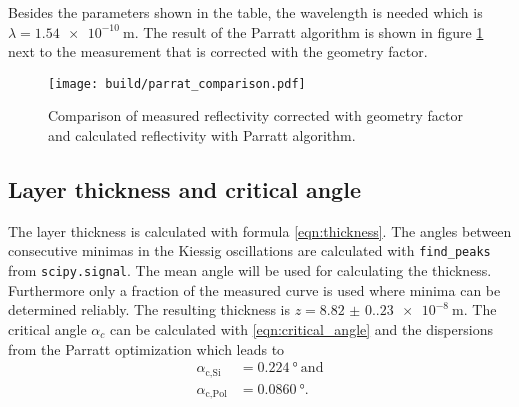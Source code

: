 Besides the parameters shown in the table, the wavelength is needed which is $\lambda=\qty{1.54e-10}{\m}$.
The result of the Parratt algorithm is shown in figure \ref{fig:parratt} next to the measurement that is corrected with the geometry factor. 
\begin{figure}[H]
  \centering
  \texttt{[image: build/parrat\_comparison.pdf]}
  \caption{Comparison of measured reflectivity corrected with geometry factor and calculated reflectivity with Parratt algorithm.}
  \label{fig:parratt}
\end{figure}

\subsection{Layer thickness and critical angle}
The layer thickness is calculated with formula \eqref{eqn:thickness}. 
The angles between consecutive minimas in the Kiessig oscillations are calculated with \texttt{find\_peaks} from \texttt{scipy.signal}.
The mean angle will be used for calculating the thickness. Furthermore only a fraction of the measured curve
is used where minima can be determined reliably.
The resulting thickness is $z=\qty{8.82(0.23)e-8}{\m}$.
The critical angle $\alpha_c$ can be calculated with \eqref{eqn:critical_angle} and the dispersions from the Parratt optimization which leads to
\begin{align*}
  \alpha_\text{c,Si} &=\qty{0.224}{\degree}~\text{and}\\
  \alpha_\text{c,Pol}&=\qty{0.0860}{\degree}.\\
\end{align*}






  









































